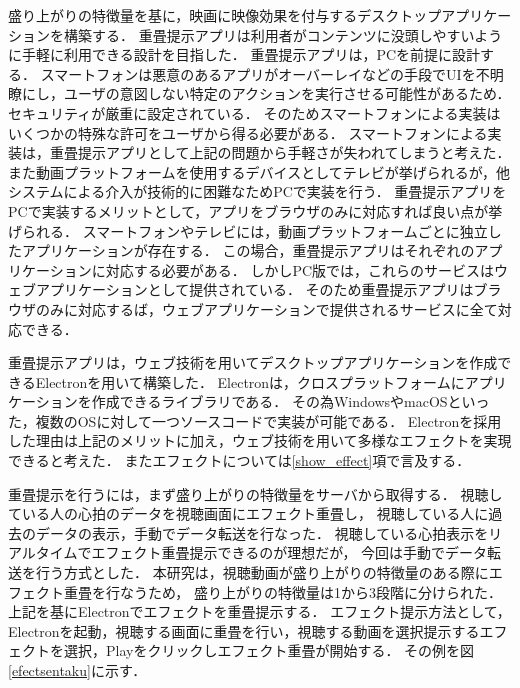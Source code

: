 盛り上がりの特徴量を基に，映画に映像効果を付与するデスクトップアプリケーションを構築する．
重畳提示アプリは利用者がコンテンツに没頭しやすいように手軽に利用できる設計を目指した．
重畳提示アプリは，PCを前提に設計する．
スマートフォンは悪意のあるアプリがオーバーレイなどの手段でUIを不明瞭にし，ユーザの意図しない特定のアクションを実行させる可能性があるため．セキュリティが厳重に設定されている．
そのためスマートフォンによる実装はいくつかの特殊な許可をユーザから得る必要がある．
スマートフォンによる実装は，重畳提示アプリとして上記の問題から手軽さが失われてしまうと考えた．
また動画プラットフォームを使用するデバイスとしてテレビが挙げられるが，他システムによる介入が技術的に困難なためPCで実装を行う．
重畳提示アプリをPCで実装するメリットとして，アプリをブラウザのみに対応すれば良い点が挙げられる．
スマートフォンやテレビには，動画プラットフォームごとに独立したアプリケーションが存在する．
この場合，重畳提示アプリはそれぞれのアプリケーションに対応する必要がある．
しかしPC版では，これらのサービスはウェブアプリケーションとして提供されている．
そのため重畳提示アプリはブラウザのみに対応するば，ウェブアプリケーションで提供されるサービスに全て対応できる．

重畳提示アプリは，ウェブ技術を用いてデスクトップアプリケーションを作成できるElectronを用いて構築した．
Electronは，クロスプラットフォームにアプリケーションを作成できるライブラリである．
その為WindowsやmacOSといった，複数のOSに対して一つソースコードで実装が可能である．
Electronを採用した理由は上記のメリットに加え，ウェブ技術を用いて多様なエフェクトを実現できると考えた．
またエフェクトについては\ref{show_effect}項で言及する．

重畳提示を行うには，まず盛り上がりの特徴量をサーバから取得する．
視聴している人の心拍のデータを視聴画面にエフェクト重畳し，
視聴している人に過去のデータの表示，手動でデータ転送を行なった．
視聴している心拍表示をリアルタイムでエフェクト重畳提示できるのが理想だが，
今回は手動でデータ転送を行う方式とした．
本研究は，視聴動画が盛り上がりの特徴量のある際にエフェクト重畳を行なうため，
盛り上がりの特徴量は1から3段階に分けられた．
上記を基にElectronでエフェクトを重畳提示する．
エフェクト提示方法として，Electronを起動，視聴する画面に重畳を行い，視聴する動画を選択提示するエフェクトを選択，Playをクリックしエフェクト重畳が開始する．
その例を図\ref{efectsentaku}に示す．
 
